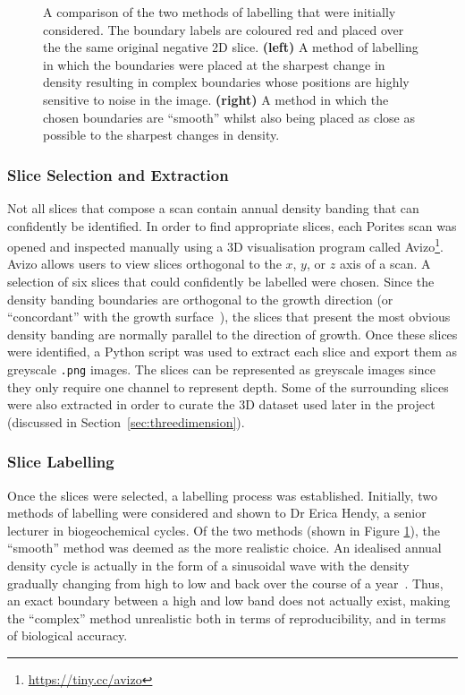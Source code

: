 \begin{figure}[t]
\begin{subfigure}[t]{0.49\textwidth}
    \end{subfigure}
    \caption{A comparison of the two methods of labelling that were initially considered. The boundary labels are coloured red and placed over the the same original negative 2D slice. \textbf{(left)} A method of labelling in which the boundaries were placed at the sharpest change in density resulting in complex boundaries whose positions are highly sensitive to noise in the image. \textbf{(right)} A method in which the chosen boundaries are ``smooth'' whilst also being placed as close as possible to the sharpest changes in density.}
    \label{fig:labelstyle}
\end{figure}

\subsubsection{Slice Selection and Extraction}

Not all slices that compose a scan contain annual density banding that can confidently be identified. In order to find appropriate slices, each Porites scan was opened and inspected manually using a 3D visualisation program called Avizo\footnote{\url{https://tiny.cc/avizo}}. Avizo allows users to view slices orthogonal to the $x$, $y$, or $z$ axis of a scan. A selection of six slices that could confidently be labelled were chosen. Since the density banding boundaries are orthogonal to the growth direction (or ``concordant'' with the growth surface~\cite{knutson}), the slices that present the most obvious density banding are normally parallel to the direction of growth. Once these slices were identified, a Python script was used to extract each slice and export them as greyscale \texttt{.png} images. The slices can be represented as greyscale images since they only require one channel to represent depth. Some of the surrounding slices were also extracted in order to curate the 3D dataset used later in the project (discussed in Section~\ref{sec:threedimension}).

\subsubsection{Slice Labelling}

Once the slices were selected, a labelling process was established. Initially, two methods of labelling were considered and shown to Dr Erica Hendy, a senior lecturer in biogeochemical cycles. Of the two methods (shown in Figure \ref{fig:labelstyle}), the ``smooth'' method was deemed as the more realistic choice. An idealised annual density cycle is actually in the form of a sinusoidal wave with the density gradually changing from high to low and back over the course of a year~\cite[p. 39]{coralsine}. Thus, an exact boundary between a high and low band does not actually exist, making the ``complex'' method unrealistic both in terms of reproducibility, and in terms of biological accuracy.

